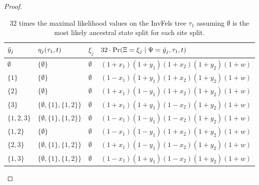 \begin{proof}
\begin{table}
\centering
\begin{tabular}{|lll|l|}
\hline
$\tilde{y}_j$ & $\eta_j(\tau_1, t)$ & $\xi_j$ & $32\cdot\Pr(\Xi=\xi_j \mid \Psi=\tilde{y}_j,\tau_1,t)$\\
\hline
$\emptyset$&$\{\emptyset\}$&$\emptyset$&$(1+x_1)(1+y_1)(1+x_2)(1+y_2)(1+w)$\\
$\{1\}$    &$\{\emptyset\}$&$\emptyset$&$(1-x_1)(1+y_1)(1+x_2)(1+y_2)(1+w)$\\
$\{2\}$    &$\{\emptyset\}$&$\emptyset$&$(1+x_1)(1-y_1)(1+x_2)(1+y_2)(1+w)$\\
$\{3\}$    &$\{\emptyset,\{1\},\{1,2\}\}$&$\emptyset$&$(1+x_1)(1+y_1)(1-x_2)(1+y_2)(1+w)$\\
$\{1,2,3\}$&$\{\emptyset,\{1\},\{1,2\}\}$&$\emptyset$&$(1-x_1)(1-y_1)(1-x_2)(1+y_2)(1+w)$\\
$\{1,2\}$  &$\{\emptyset\}$&$\emptyset$&$(1-x_1)(1-y_1)(1+x_2)(1+y_2)(1+w)$\\
$\{2,3\}$  &$\{\emptyset,\{1\},\{1,2\}\}$&$\emptyset$&$(1+x_1)(1-y_1)(1-x_2)(1+y_2)(1+w)$\\
$\{1,3\}$  &$\{\emptyset,\{1\},\{1,2\}\}$&$\emptyset$&$(1-x_1)(1+y_1)(1-x_2)(1+y_2)(1+w)$\\
\hline
\end{tabular}
\caption{
32 times the maximal likelihood values on the InvFels tree $\tau_1$ assuming $\emptyset$ is the most likely ancestral state split for each site split.
}
\label{tab:likelihoods-restricted}
\end{table}


\end{proof}
